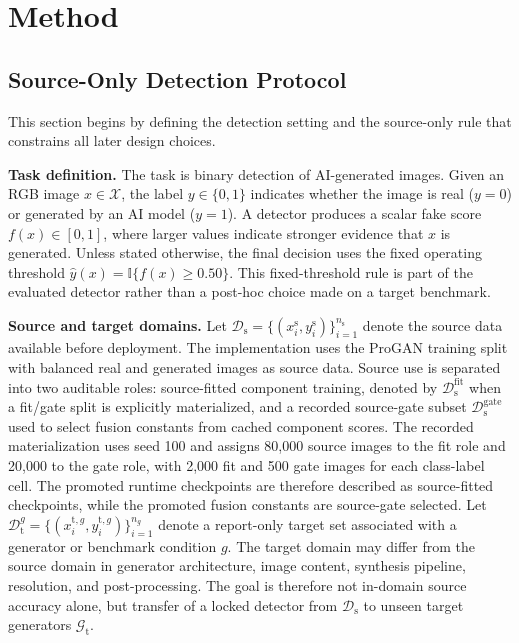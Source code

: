 \documentclass[letterpaper,journal]{IEEEtran}
\begin{document}
\section{Method}
\label{sec:method}

\subsection{Source-Only Detection Protocol}
\label{sec:problem_formulation}

This section begins by defining the detection setting and the source-only rule that constrains all later design choices.

\textbf{Task definition.}
The task is binary detection of AI-generated images. Given an RGB image $x \in \mathcal{X}$, the label $y \in \{0,1\}$ indicates whether the image is real ($y=0$) or generated by an AI model ($y=1$). A detector produces a scalar fake score $f(x) \in [0,1]$, where larger values indicate stronger evidence that $x$ is generated. Unless stated otherwise, the final decision uses the fixed operating threshold $\hat{y}(x)=\mathbb{I}\{f(x)\geq0.50\}$. This fixed-threshold rule is part of the evaluated detector rather than a post-hoc choice made on a target benchmark.

\textbf{Source and target domains.}
Let $\mathcal{D}_{\mathrm{s}}=\{(x_i^{\mathrm{s}},y_i^{\mathrm{s}})\}_{i=1}^{n_{\mathrm{s}}}$ denote the source data available before deployment. The implementation uses the ProGAN training split with balanced real and generated images as source data. Source use is separated into two auditable roles: source-fitted component training, denoted by $\mathcal{D}_{\mathrm{s}}^{\mathrm{fit}}$ when a fit/gate split is explicitly materialized, and a recorded source-gate subset $\mathcal{D}_{\mathrm{s}}^{\mathrm{gate}}$ used to select fusion constants from cached component scores. The recorded materialization uses seed 100 and assigns 80,000 source images to the fit role and 20,000 to the gate role, with 2,000 fit and 500 gate images for each class-label cell. The promoted runtime checkpoints are therefore described as source-fitted checkpoints, while the promoted fusion constants are source-gate selected. Let $\mathcal{D}_{\mathrm{t}}^{g}=\{(x_i^{\mathrm{t},g},y_i^{\mathrm{t},g})\}_{i=1}^{n_g}$ denote a report-only target set associated with a generator or benchmark condition $g$. The target domain may differ from the source domain in generator architecture, image content, synthesis pipeline, resolution, and post-processing. The goal is therefore not in-domain source accuracy alone, but transfer of a locked detector from $\mathcal{D}_{\mathrm{s}}$ to unseen target generators $\mathcal{G}_{\mathrm{t}}$.
\end{document}
